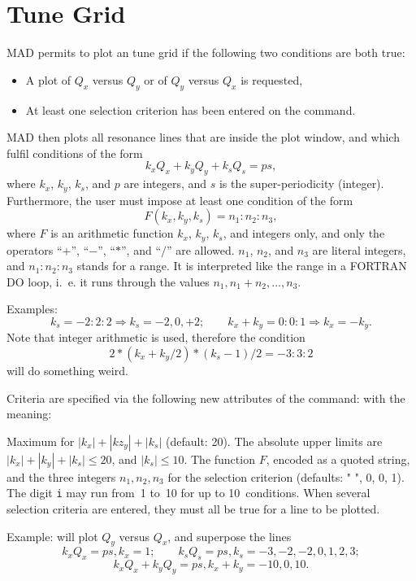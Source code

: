 \section{Tune Grid}
MAD permits to plot an tune grid if the following two conditions
are both true:
\begin{itemize}
\item A plot of \(Q_x\) versus \(Q_y\) or of \(Q_y\) versus \(Q_x\)
is requested,
\item At least one selection criterion has been entered on the 
command.
\end{itemize}
MAD then plots all resonance lines that are inside the plot window,
and which fulfil conditions of the form
\[ k_x Q_x + k_y Q_y + k_s Q_s = p s, \]
where \(k_x\), \(k_y\), \(k_s\), and \(p\) are integers,
and \(s\) is the super-periodicity (integer).
Furthermore, the user must impose at least one condition of the form
\[ F(k_x,k_y,k_s)=n_1:n_2:n_3, \]
where \(F\) is an arithmetic function \(k_x\), \(k_y\), \(k_s\),
and integers only,
and only the operators ``\(+\)'', ``\(-\)'', ``\(*\)'',
and ``\(/\)'' are allowed.
\(n_1\), \(n_2\), and \(n_3\) are literal integers,
and \(n_1:n_2:n_3\) stands for a range.
It is interpreted like the range in a FORTRAN DO loop,
i.~e. it runs through the values \(n_1, n_1 + n_2, \ldots , n_3\).
 
Examples:
\[
k_s = -2:2:2 \Rightarrow k_s = -2, 0, +2; \qquad
k_x + k_y = 0:0:1 \Rightarrow k_x = - k_y.
\]
Note that integer arithmetic is used, therefore the condition
\[ 2 * (k_x + k_y / 2) * (k_s - 1) / 2 = -3:3:2 \]
will do something weird.
 
Criteria are specified via the following new attributes of the
 command:
with the meaning:
\begin{mylist}
Maximum for \(|k_x| + |kz_y| + |k_s|\) (default: 20).
The absolute upper limits are \(|k_x| + |k_y| + |k_s| \le 20\),
and \(|k_s| \le 10\).
The function \(F\), encoded as a quoted string,
and the three integers \(n_1,n_2,n_3\) for the selection criterion
(defaults: " ", 0, 0, 1).
The digit {\tt i} may run from~1 to~10 for up to 10~conditions.
When several selection criteria are entered,
they must all be true for a line to be plotted.
\end{mylist}
\noindent Example:
will plot \(Q_y\) versus \(Q_x\),
and superpose the lines
\[ k_x Q_x = p s, k_x = 1; \qquad
k_s Q_s = p s, k_s = -3, -2, -2, 0, 1, 2, 3; \]
\[ k_x Q_x + k_y Q_y = p s, k_x + k_y = -10, 0, 10. \]
 
